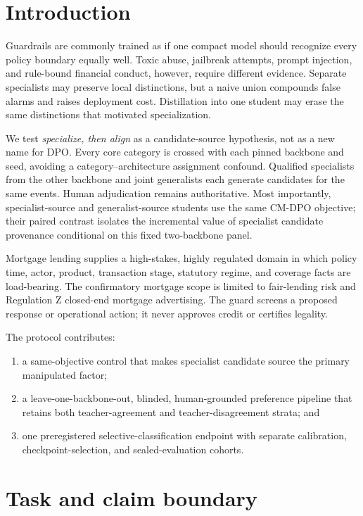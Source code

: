 \documentclass[10pt]{article}
\newcommand{\method}{\textsc{CM-DPO}}
\begin{document}
\section{Introduction}

Guardrails are commonly trained as if one compact model should recognize every
policy boundary equally well. Toxic abuse, jailbreak attempts, prompt injection,
and rule-bound financial conduct, however, require different evidence. Separate
specialists may preserve local distinctions, but a naive union compounds false
alarms and raises deployment cost. Distillation into one student may erase the
same distinctions that motivated specialization.

We test \emph{specialize, then align} as a candidate-source hypothesis, not as a
new name for DPO. Every core category is crossed with each pinned backbone and
seed, avoiding a category--architecture assignment confound. Qualified
specialists from the other backbone and joint generalists each generate
candidates for the same events. Human adjudication remains authoritative. Most
importantly, specialist-source and generalist-source students use the same
\method{} objective; their paired contrast isolates the incremental value of
specialist candidate provenance conditional on this fixed two-backbone panel.

Mortgage lending supplies a high-stakes, highly regulated domain in which policy
time, actor, product, transaction stage, statutory regime, and coverage facts are
load-bearing. The confirmatory mortgage scope is limited to fair-lending risk and
Regulation Z closed-end mortgage advertising. The guard screens a proposed
response or operational action; it never approves credit or certifies legality.

The protocol contributes:
\begin{enumerate}
  \item a same-objective control that makes specialist candidate source the
  primary manipulated factor;
  \item a leave-one-backbone-out, blinded, human-grounded preference pipeline
  that retains both teacher-agreement and teacher-disagreement strata; and
  \item one preregistered selective-classification endpoint with separate
  calibration, checkpoint-selection, and sealed-evaluation cohorts.
\end{enumerate}

\section{Task and claim boundary}
\end{document}
